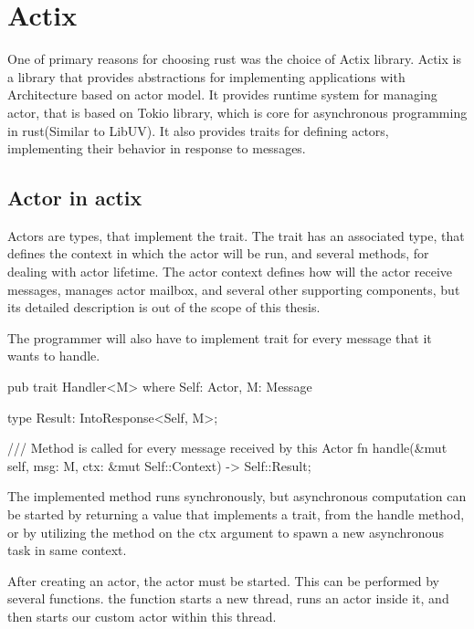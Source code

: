 \section{Actix}
One of primary reasons for choosing rust was the choice of Actix\cite{web:actix} library. Actix is a library that provides abstractions
for implementing applications with Architecture based on actor model. It provides runtime system for managing actor, that is
based on Tokio library, which is core for asynchronous programming in rust(Similar to LibUV). It also provides
traits for defining actors, implementing their behavior in response to messages.

\subsection{Actor in actix}
Actors are types, that implement the  trait. The  trait has an associated type, that defines the context in which the actor will be run,
and several methods, for dealing with actor lifetime.
The actor context defines how will the actor receive messages, manages actor mailbox, and several other
supporting components, but its detailed description is out of the scope of this thesis.

The programmer will also have to implement  trait for every message that it wants to handle.

\begin{code}[language=rust,label={handler_trait},caption={Handler trait}]
    pub trait Handler<M> where Self: Actor, M: Message
    {
        type Result: IntoResponse<Self, M>;

        /// Method is called for every message received by this Actor
        fn handle(&mut self, msg: M, ctx: &mut Self::Context) -> Self::Result;

    }
\end{code}

The implemented  method runs synchronously, but asynchronous computation
can be started by returning a value that implements a   trait, from the handle method, or by utilizing the 
method on the ctx argument to spawn a new asynchronous task in same context.

After creating an actor, the actor must be started. This can be performed by several functions.
the  function starts a new thread, runs an  actor inside it, and then
starts our custom actor within this thread.

